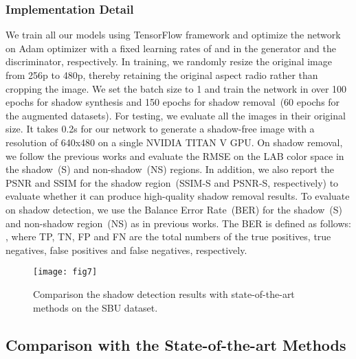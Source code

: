 \documentclass[letterpaper]{article} \usepackage{aaai20}  \usepackage{times}  \usepackage{helvet} \usepackage{courier}  \usepackage[hyphens]{url}  \urlstyle{rm} \def\UrlFont{\rm}  \usepackage{graphicx}  \frenchspacing  \setlength{\pdfpagewidth}{8.5in}  \setlength{\pdfpageheight}{11in}  \usepackage{amssymb}
\begin{document}
\subsubsection{Implementation Detail}
We train all our models using TensorFlow framework and optimize the network on Adam optimizer \cite{kingma2014adam} with a fixed learning rates of  and  in the generator and the discriminator, respectively. In training, we randomly resize the original image from 256p to 480p, thereby retaining the original aspect radio rather than cropping the image. We set the batch size to 1 and train the network in over 100 epochs for shadow synthesis and 150 epochs for shadow removal~(60 epochs for the augmented datasets). For testing, we evaluate all the images in their original size. It takes 0.2s for our network to generate a shadow-free image with a resolution of 640x480 on a single NVIDIA TITAN V GPU. On shadow removal, we follow the previous works and evaluate the RMSE on the LAB color space in the shadow~(S) and non-shadow~(NS) regions. In addition, we also report the PSNR and SSIM for the shadow region~(SSIM-S and PSNR-S, respectively) to evaluate whether it can produce high-quality shadow removal results. To evaluate on shadow detection, we use the Balance Error Rate~(BER) for the shadow~(S) and non-shadow region~(NS) as in previous works. The BER is defined as follows: , 
where TP, TN, FP and FN are the total numbers of the true positives, true negatives, false positives and false negatives, respectively.

\begin{figure*}[t]
\centering     \texttt{[image: fig7]}
\caption{Comparison the shadow detection results with state-of-the-art methods on the SBU dataset.}
\label{fig:sbu}
\end{figure*}

\subsection{Comparison with the State-of-the-art Methods}
\end{document}
